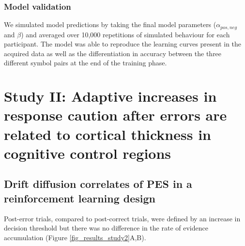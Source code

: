 \documentclass[12pt,openany]{book}
\theoremstyle{definition}
\theoremstyle{definition}
\theoremstyle{definition}
\theoremstyle{remark}
\begin{document}
\subsubsection{Model validation}\label{model-validation}

We simulated model predictions by taking the final model parameters
(\(\alpha_{pos,neg}\) and \(\beta\)) and averaged over 10,000
repetitions of simulated behaviour for each participant. The model was
able to reproduce the learning curves present in the acquired data as
well as the differentiation in accuracy between the three different
symbol pairs at the end of the training phase.

\section{Study II: Adaptive increases in response caution after errors
are related to cortical thickness in cognitive control
regions}\label{study-ii-adaptive-increases-in-response-caution-after-errors-are-related-to-cortical-thickness-in-cognitive-control-regions}

\subsection{Drift diffusion correlates of PES in a reinforcement
learning
design}\label{drift-diffusion-correlates-of-pes-in-a-reinforcement-learning-design}

Post-error trials, compared to post-correct trials, were defined by an
increase in decision threshold but there was no difference in the rate
of evidence accumulation (Figure \ref{fig_results_study2}A,B).
\end{document}
